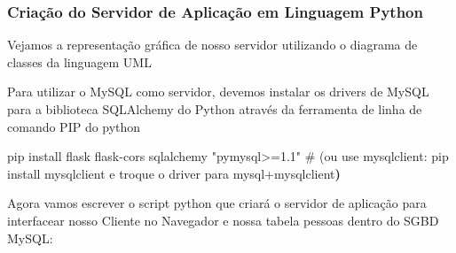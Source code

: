 \documentclass[
]{book}
\makeatletter
\newenvironment{Shaded}{\begin{snugshade}}{\end{snugshade}}
\newcommand{\AttributeTok}[1]{\textcolor[rgb]{0.13,0.29,0.53}{#1}}
\newcommand{\KeywordTok}[1]{\textcolor[rgb]{0.13,0.29,0.53}{\textbf{#1}}}
\newcommand{\NormalTok}[1]{#1}
\newcommand{\StringTok}[1]{\textcolor[rgb]{0.31,0.60,0.02}{#1}}
\newcommand*\pandocbounded[1]{%
  \sbox\pandoc@box{#1}%
  \Gscale@div\@tempa{\textheight}{\dimexpr\ht\pandoc@box+\dp\pandoc@box\relax}%
  \Gscale@div\@tempb{\linewidth}{\wd\pandoc@box}%
  \ifdim\@tempb\p@<\@tempa\p@\let\@tempa\@tempb\fi%
  \ifdim\@tempa\p@<\p@\scalebox{\@tempa}{\usebox\pandoc@box}%
  \else\usebox{\pandoc@box}%
  \fi%
}
\makeatother
\begin{document}
\subsubsection{Criação do Servidor de Aplicação em Linguagem Python}\label{criauxe7uxe3o-do-servidor-de-aplicauxe7uxe3o-em-linguagem-python}

Vejamos a representação gráfica de nosso servidor utilizando o diagrama de classes da linguagem UML

\pandocbounded{}

Para utilizar o MySQL como servidor, devemos instalar os drivers de MySQL para a biblioteca SQLAlchemy do Python através da ferramenta de linha de comando PIP do python

\begin{Shaded}
\begin{Highlighting}[]
\NormalTok{pip install flask flask}\AttributeTok{{-}cors}\NormalTok{ sqlalchemy }\StringTok{"pymysql\textgreater{}=1.1"}
\NormalTok{\# (ou use mysqlclient: pip install mysqlclient e troque o driver para mysql+mysqlclient}\KeywordTok{)}
\end{Highlighting}
\end{Shaded}

Agora vamos escrever o script python que criará o servidor de aplicação para interfacear nosso Cliente no Navegador e nossa tabela pessoas dentro do SGBD MySQL:
\end{document}
